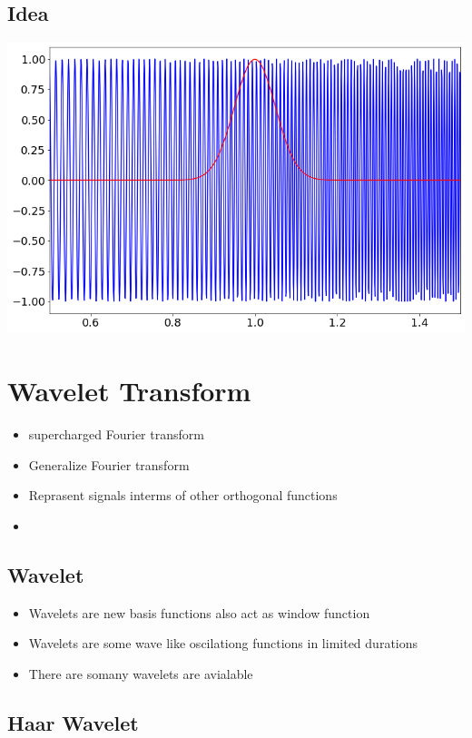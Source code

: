\documentclass[11pt]{article}
\begin{document}
\subsection{Idea}
\label{sec:org4942606}
\begin{center}
\includegraphics[width=.9\linewidth]{./gabor.png}
\end{center}
\section{Wavelet Transform}
\label{sec:orgd9abf7d}
\begin{itemize}
\item supercharged Fourier transform
\item Generalize Fourier transform
\item Reprasent signals interms of other orthogonal functions
\item 
\end{itemize}
\subsection{Wavelet}
\label{sec:org0d62c18}
\begin{itemize}
\item Wavelets are new basis functions also act as window function
\item Wavelets are some wave like oscilationg functions in limited durations
\item There are somany wavelets are avialable
\end{itemize}
\subsection{Haar Wavelet}
\label{sec:org00683c1}
\end{document}
